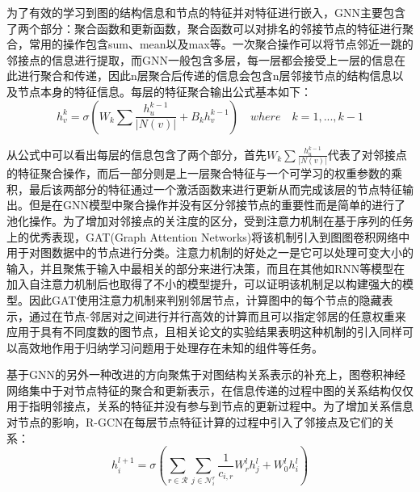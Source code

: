 为了有效的学习到图的结构信息和节点的特征并对特征进行嵌入，GNN主要包含了两个部分：聚合函数和更新函数，聚合函数可以对排名的邻接节点的特征进行聚合，常用的操作包含sum、mean以及max等。一次聚合操作可以将节点邻近一跳的邻接点的信息进行提取，而GNN一般包含多层，每一层都会接受上一层的信息在此进行聚合和传递，因此n层聚合后传递的信息会包含n层邻接节点的结构信息以及节点本身的特征信息。每层的特征聚合输出公式基本如下：
\begin{equation}
  h_{v}^{k} = \sigma(W_{k} \sum \frac{h_{u}^{k-1}}{|N(v)|} + B_{k}h_{v}^{k-1}) \quad where \quad k = 1, ..., k-1 \label{eq:2-4}
\end{equation}

从公式中可以看出每层的信息包含了两个部分，首先\(W_{k}\sum\frac{h^{k-1}_{u}}{|N(v)|}\)代表了对邻接点的特征聚合操作，而后一部分则是上一层聚合特征与一个可学习的权重参数的乘积，最后该两部分的特征通过一个激活函数来进行更新从而完成该层的节点特征输出。但是在GNN模型中聚合操作并没有区分邻接节点的重要性而是简单的进行了池化操作。为了增加对邻接点的关注度的区分，受到注意力机制在基于序列的任务上的优秀表现，GAT(Graph Attention Networks)将该机制引入到图图卷积网络中用于对图数据中的节点进行分类。注意力机制的好处之一是它可以处理可变大小的输入，并且聚焦于输入中最相关的部分来进行决策，而且在其他如RNN等模型在加入自注意力机制后也取得了不小的模型提升，可以证明该机制足以构建强大的模型。因此GAT使用注意力机制来判别邻居节点，计算图中的每个节点的隐藏表示，通过在节点-邻居对之间进行并行高效的计算而且可以指定邻居的任意权重来应用于具有不同度数的图节点，且相关论文的实验结果表明这种机制的引入同样可以高效地作用于归纳学习问题用于处理存在未知的组件等任务。

基于GNN的另外一种改进的方向聚焦于对图结构关系表示的补充上，图卷积神经网络集中于对节点特征的聚合和更新表示，在信息传递的过程中图的关系结构仅仅用于指明邻接点，关系的特征并没有参与到节点的更新过程中。为了增加关系信息对节点的影响，R-GCN在每层节点特征计算的过程中引入了邻接点及它们的关系：
\begin{equation}
  h_{i}^{l+1} = \sigma \left( \sum_{r\in\mathcal{R}} \sum_{j\in\mathcal{N}_{i}^{r}} \frac{1}{c_{i,r}}W_{r}^{l}h_{j}^{l} + W_{0}^{l}h_{i}^{l}\right) \label{eq:2-5}
\end{equation}

